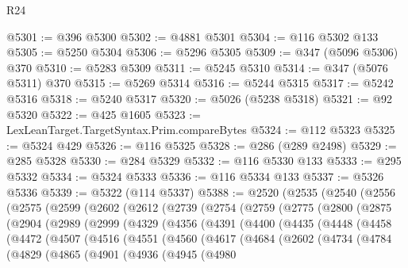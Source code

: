 \begin{lexlean}{R24}
\begin{coremodule}
@5301 := @396 @5300
@5302 := @4881 @5301
@5304 := @116 @5302 @133
@5305 := @5250 @5304
@5306 := @5296 @5305
@5309 := @347 (@5096 @5306) @370
@5310 := @5283 @5309
@5311 := @5245 @5310
@5314 := @347 (@5076 @5311) @370
@5315 := @5269 @5314
@5316 := @5244 @5315
@5317 := @5242 @5316
@5318 := @5240 @5317
@5320 := @5026 (@5238 @5318)
@5321 := @92 @5320
@5322 := @425 @1605
@5323 := LexLeanTarget.TargetSyntax.Prim.compareBytes
@5324 := @112 @5323
@5325 := @5324 @429
@5326 := @116 @5325
@5328 := @286 (@289 @2498)
@5329 := @285 @5328
@5330 := @284 @5329
@5332 := @116 @5330 @133
@5333 := @295 @5332
@5334 := @5324 @5333
@5336 := @116 @5334 @133
@5337 := @5326 @5336
@5339 := @5322 (@114 @5337)
@5388 := @2520
    (@2535
      (@2540
        (@2556
          (@2575
            (@2599
              (@2602
                (@2612
                  (@2739
                    (@2754
                      (@2759
                        (@2775
                          (@2800
                            (@2875
                              (@2904
                                (@2989
                                  (@2999
                                    (@4329
                                      (@4356
                                        (@4391
                                          (@4400
                                            (@4435
                                              (@4448
                                                (@4458
                                                  (@4472
                                                    (@4507
                                                      (@4516
                                                        (@4551
                                                          (@4560
                                                            (@4617
                                                              (@4684
                                                                (@2602
                                                                  (@4734
                                                                    (@4784
                                                                      (@4829
                                                                        (@4865
                                                                          (@4901
                                                                            (@4936
                                                                              (@4945
                                                                                (@4980

\end{coremodule}
\end{lexlean}
